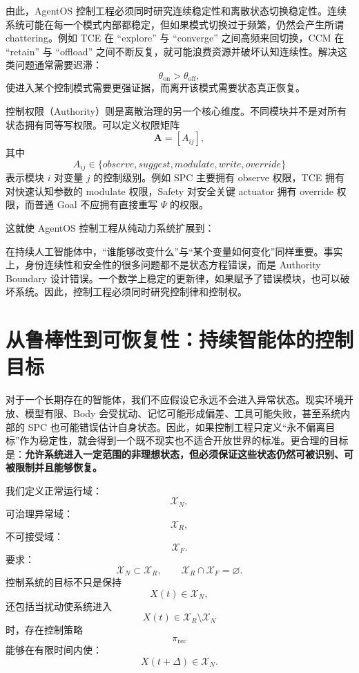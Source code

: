 由此，AgentOS 控制工程必须同时研究连续稳定性和离散状态切换稳定性。连续系统可能在每一个模式内部都稳定，但如果模式切换过于频繁，仍然会产生所谓 chattering。例如 TCE 在 ``explore'' 与 ``converge'' 之间高频来回切换，CCM 在 ``retain'' 与 ``offload'' 之间不断反复，就可能浪费资源并破坏认知连续性。解决这类问题通常需要迟滞：
\[
\theta_{\mathrm{on}}
>
\theta_{\mathrm{off}},
\]
使进入某个控制模式需要更强证据，而离开该模式需要状态真正恢复。

控制权限（Authority）则是离散治理的另一个核心维度。不同模块并不是对所有状态拥有同等写权限。可以定义权限矩阵
\[
\mathbf A
=
[A_{ij}],
\]
其中
\[
A_{ij}\in
\{
observe,
suggest,
modulate,
write,
override
\}
\]
表示模块 $i$ 对变量 $j$ 的控制级别。例如 SPC 主要拥有 observe 权限，TCE 拥有对快速认知参数的 modulate 权限，Safety 对安全关键 actuator 拥有 override 权限，而普通 Goal 不应拥有直接重写 $\Psi$ 的权限。

这就使 AgentOS 控制工程从纯动力系统扩展到：
\begin{statementbox}
\centering
{}
\end{statementbox}
在持续人工智能体中，“谁能够改变什么”与“某个变量如何变化”同样重要。事实上，身份连续性和安全性的很多问题都不是状态方程错误，而是 Authority Boundary 设计错误。一个数学上稳定的更新律，如果赋予了错误模块，也可以破坏系统。因此，控制工程必须同时研究控制律和控制权。

\section{从鲁棒性到可恢复性：持续智能体的控制目标}

对于一个长期存在的智能体，我们不应假设它永远不会进入异常状态。现实环境开放、模型有限、Body 会受扰动、记忆可能形成偏差、工具可能失败，甚至系统内部的 SPC 也可能错误估计自身状态。因此，如果控制工程只定义“永不偏离目标”作为稳定性，就会得到一个既不现实也不适合开放世界的标准。更合理的目标是：\textbf{允许系统进入一定范围的非理想状态，但必须保证这些状态仍然可被识别、可被限制并且能够恢复。}

我们定义正常运行域：
\[
\mathcal X_N,
\]
可治理异常域：
\[
\mathcal X_R,
\]
不可接受域：
\[
\mathcal X_F.
\]
要求：
\[
\mathcal X_N
\subset
\mathcal X_R,
\qquad
\mathcal X_R
\cap
\mathcal X_F
=
\varnothing.
\]
控制系统的目标不只是保持
\[
X(t)\in\mathcal X_N,
\]
还包括当扰动使系统进入
\[
X(t)\in
\mathcal X_R\setminus\mathcal X_N
\]
时，存在控制策略
\[
\pi_{\mathrm{rec}}
\]
能够在有限时间内使：
\[
X(t+\Delta)
\in
\mathcal X_N.
\]

